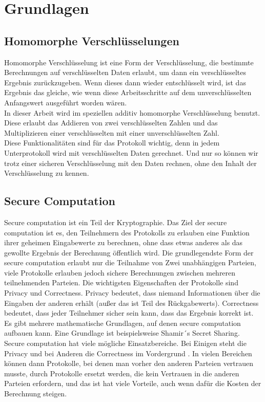 \chapter{Grundlagen}


\section{Homomorphe Verschlüsselungen}
Homomorphe Verschlüsselung ist eine Form der Verschlüsselung, die bestimmte Berechnungen auf verschlüsselten Daten erlaubt, um dann ein verschlüsseltes Ergebnis zurückzugeben. Wenn dieses dann wieder entschlüsselt wird, ist das Ergebnis das gleiche, wie wenn diese Arbeitsschritte auf dem unverschlüsselten Anfangswert ausgeführt worden wären. \cite{Yi2014} \\
In dieser Arbeit wird im speziellen additiv homomorphe Verschlüsselung benutzt. Diese  erlaubt das Addieren von zwei verschlüsselten Zahlen und das Multiplizieren einer verschlüsselten mit einer unverschlüsselten Zahl.\\
Diese Funktionalitäten sind für das Protokoll wichtig, denn in jedem Unterprotokoll wird mit verschlüsselten Daten gerechnet. Und nur so können wir trotz einer sicheren Verschlüsselung mit den Daten rechnen, ohne den Inhalt der Verschlüsselung zu kennen.

\section{Secure Computation}
Secure computation ist ein Teil der Kryptographie. Das Ziel der secure computation ist es, den Teilnehmern des Protokolls zu erlauben eine Funktion ihrer geheimen Eingabewerte zu berechnen, ohne dass etwas anderes als das gewollte Ergebnis der Berechnung öffentlich wird. \cite{cryptoeprint:2020:300} Die grundlegendste Form der secure computation erlaubt nur die Teilnahme von Zwei unabhängigen Parteien, viele Protokolle erlauben jedoch sichere Berechnungen zwischen mehreren teilnehmenden Parteien. Die wichtigsten Eigenschaften der Protokolle sind Privacy und Correctness. Privacy bedeutet, dass niemand Informationen über die Eingaben der anderen erhält (außer das ist Teil des Rückgabewerts). Correctness bedeutet, dass jeder Teilnehmer sicher sein kann, dass das Ergebnis korrekt ist. \cite{cryptoeprint:2020:300} Es gibt mehrere mathematische Grundlagen, auf denen secure computation aufbauen kann. Eine Grundlage ist beispielsweise Shamir´s Secret Sharing. Secure computation hat viele mögliche Einsatzbereiche. Bei Einigen steht die Privacy und bei Anderen die Correctness im Vordergrund \cite{cryptoeprint:2020:300}. In vielen Bereichen können dann Protokolle, bei denen man vorher den anderen Parteien vertrauen musste, durch Protokolle ersetzt werden, die kein Vertrauen in die anderen Parteien erfordern, und das ist hat viele Vorteile, auch wenn dafür die Kosten der Berechnung steigen.
